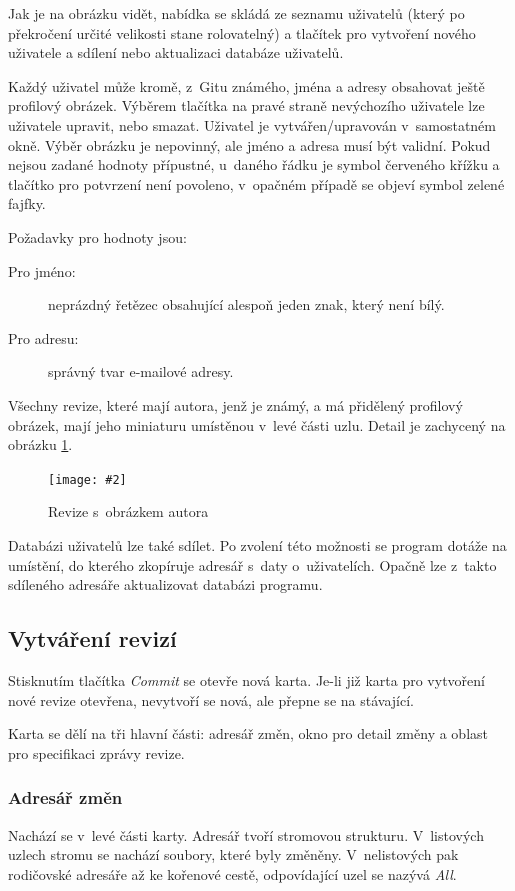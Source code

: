 \documentclass[
  biblatex,
  glossaries,
  index
]{kidiplom}
\newcommand{\pic}[4]{
\begin{figure}[h]
\centering
\texttt{[image: \#2]}
\caption{#3}
\label{fig:#4}
\end{figure}}
\begin{document}
Jak je na obrázku vidět, nabídka se skládá ze seznamu uživatelů (který po překročení určité velikosti stane rolovatelný) a tlačítek pro vytvoření nového uživatele a sdílení nebo aktualizaci databáze uživatelů.

Každý uživatel může kromě, z~Gitu známého, jména a adresy obsahovat ještě profilový obrázek. Výběrem tlačítka na pravé straně nevýchozího uživatele lze uživatele upravit, nebo smazat. Uživatel je vytvářen/upravován v~samostatném okně. Výběr obrázku je nepovinný, ale jméno a adresa musí být validní. Pokud nejsou zadané hodnoty přípustné, u~daného řádku je symbol červeného křížku a tlačítko pro potvrzení není povoleno, v~opačném případě se objeví symbol zelené fajfky.

Požadavky pro hodnoty jsou:
\begin{description}
\item[Pro jméno:] neprázdný řetězec obsahující alespoň jeden znak, který není bílý.
\item[Pro adresu:] správný tvar e-mailové adresy.
\end{description}

Všechny revize, které mají autora, jenž je známý, a má přidělený profilový obrázek, mají jeho miniaturu umístěnou v~levé části uzlu. Detail je zachycený na obrázku \ref{fig:user}.

\pic{10cm}{user.png}{Revize s~obrázkem autora}{user}

Databázi uživatelů lze také sdílet. Po zvolení této možnosti se program dotáže na umístění, do kterého zkopíruje adresář s~daty o~uživatelích. Opačně lze z~takto sdíleného adresáře aktualizovat databázi programu.

\subsection{Vytváření revizí}
Stisknutím tlačítka {\it Commit} se otevře nová karta. Je-li již karta pro vytvoření nové revize otevřena, nevytvoří se nová, ale přepne se na stávající.

Karta se dělí na tři hlavní části: adresář změn, okno pro detail změny a oblast pro specifikaci zprávy revize.

\subsubsection{Adresář změn}
Nachází se v~levé části karty. Adresář tvoří stromovou strukturu. V~listových uzlech stromu se nachází soubory, které byly změněny. V~nelistových pak rodičovské adresáře až ke kořenové cestě, odpovídající uzel se nazývá {\it All}.
\end{document}
